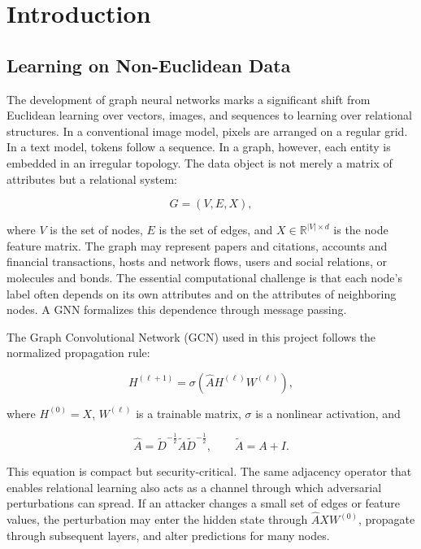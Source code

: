 \documentclass[12pt,oneside]{report}
\begin{document}
\chapter{Introduction}

\section{Learning on Non-Euclidean Data}
The development of graph neural networks marks a significant shift from Euclidean learning over vectors, images, and sequences to learning over relational structures. In a conventional image model, pixels are arranged on a regular grid. In a text model, tokens follow a sequence. In a graph, however, each entity is embedded in an irregular topology. The data object is not merely a matrix of attributes but a relational system:

$$
G=(V,E,X),
$$

where $V$ is the set of nodes, $E$ is the set of edges, and $X\in\mathbb{R}^{|V|\times d}$ is the node feature matrix. The graph may represent papers and citations, accounts and financial transactions, hosts and network flows, users and social relations, or molecules and bonds. The essential computational challenge is that each node's label often depends on its own attributes and on the attributes of neighboring nodes. A GNN formalizes this dependence through message passing.

The Graph Convolutional Network (GCN) used in this project follows the normalized propagation rule:

$$
H^{(\ell+1)}=\sigma\left(\hat{A}H^{(\ell)}W^{(\ell)}\right),
$$

where $H^{(0)}=X$, $W^{(\ell)}$ is a trainable matrix, $\sigma$ is a nonlinear activation, and

$$
\hat{A}=\tilde{D}^{-\frac{1}{2}}\tilde{A}\tilde{D}^{-\frac{1}{2}},\qquad \tilde{A}=A+I.
$$

This equation is compact but security-critical. The same adjacency operator that enables relational learning also acts as a channel through which adversarial perturbations can spread. If an attacker changes a small set of edges or feature values, the perturbation may enter the hidden state through $\hat{A}XW^{(0)}$, propagate through subsequent layers, and alter predictions for many nodes.
\end{document}
